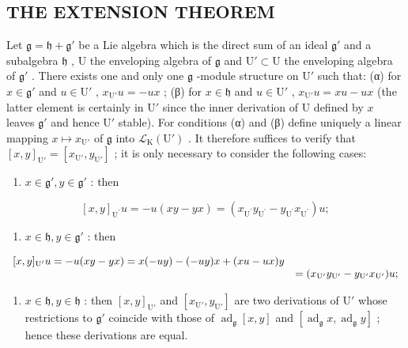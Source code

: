 \subsection{THE EXTENSION THEOREM}

Let \(\mathfrak{g} = \mathfrak{h} + \mathfrak{g}'\) be a Lie algebra which is the direct sum of an ideal \(\mathfrak{g}'\) and a subalgebra \(\mathfrak{h}\) , U the enveloping algebra of \(\mathfrak{g}\) and \(\mathrm{U}' \subset \mathrm{U}\) the enveloping algebra of \(\mathfrak{g}'\) . There exists one and only one \(\mathfrak{g}\) -module structure on \(\mathrm{U}'\) such that: (α) for \(x \in \mathfrak{g}'\) and \(u \in \mathrm{U}'\) , \(x_{\mathrm{U}'}u = -ux\) ; (β) for \(x \in \mathfrak{h}\) and \(u \in \mathrm{U}'\) , \(x_{\mathrm{U}'}u = xu - ux\) (the latter element is certainly in \(\mathrm{U}'\) since the inner derivation of U defined by \(x\) leaves \(\mathfrak{g}'\) and hence \(\mathrm{U}'\) stable). For conditions (α) and (β) define uniquely a linear mapping \(x \mapsto x_{\mathrm{U}'}\) of \(\mathfrak{g}\) into \(\mathcal{L}_{\mathrm{K}}(\mathrm{U}')\) . It therefore suffices to verify that \([x, y]_{\mathrm{U}'} = [x_{\mathrm{U}'}, y_{\mathrm{U}'}]\) ; it is only necessary to consider the following cases:

\begin{enumerate}
\def\labelenumi{(\arabic{enumi})}
\tightlist
\item
  \(x \in \mathfrak{g}', y \in \mathfrak{g}'\) : then
\end{enumerate}

\[
[ x, y ] _ {\mathrm{U} ^ {\prime}} u = - u (x y - y x) = \left(x _ {\mathrm{U} ^ {\prime}} y _ {\mathrm{U} ^ {\prime}} - y _ {\mathrm{U} ^ {\prime}} x _ {\mathrm{U} ^ {\prime}}\right) u;
\]

\begin{enumerate}
\def\labelenumi{(\arabic{enumi})}
\setcounter{enumi}{1}
\tightlist
\item
  \(x \in \mathfrak{h}, y \in \mathfrak{g}'\) : then
\end{enumerate}

\[
\begin{array}{r l} {[ x, y ] _ {\mathrm{U}'} u = - u (x y - y x) = x (- u y) - (- u y) x + (x u - u x) y} \\ & {= (x _ {\mathrm{U}'} y _ {\mathrm{U}'} - y _ {\mathrm{U}'} x _ {\mathrm{U}'}) u;} \end{array}
\]

\begin{enumerate}
\def\labelenumi{(\arabic{enumi})}
\setcounter{enumi}{2}
\tightlist
\item
  \(x \in \mathfrak{h}, y \in \mathfrak{h}\) : then \([x, y]_{\mathrm{U}'}\) and \([x_{\mathrm{U}'}, y_{\mathrm{U}'}]\) are two derivations of \(\mathrm{U}'\) whose restrictions to \(\mathfrak{g}'\) coincide with those of \(\operatorname{ad}_{\mathfrak{g}}[x, y]\) and \([\operatorname{ad}_{\mathfrak{g}}x, \operatorname{ad}_{\mathfrak{g}}y]\) ; hence these derivations are equal.
\end{enumerate}

